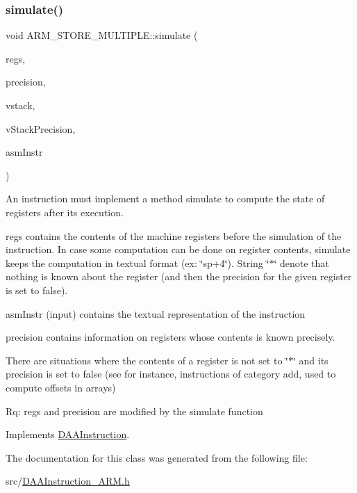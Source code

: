 \subsubsection{\texorpdfstring{simulate()}{simulate()}}
{\footnotesize\ttfamily void A\+R\+M\+\_\+\+S\+T\+O\+R\+E\+\_\+\+M\+U\+L\+T\+I\+P\+L\+E\+::simulate (\begin{DoxyParamCaption}\item[{\hyperlink{DAAInstruction_8h_af0fae93a861de9cf37988d5673cac523}{reg\+Table} \&}]{regs,  }\item[{\hyperlink{DAAInstruction_8h_a0e8cae02815a5f8adc750122d790b455}{reg\+Precision\+Table} \&}]{precision,  }\item[{\hyperlink{DAAInstruction_8h_a1b0e70ac1a04f06c8132055ed01f589f}{stack\+Type} \&}]{vstack,  }\item[{\hyperlink{DAAInstruction_8h_ac5cb793e9dac3fa9693da78b7e29ab30}{stack\+Prec\+Type} \&}]{v\+Stack\+Precision,  }\item[{const string \&}]{asm\+Instr }\end{DoxyParamCaption})\hspace{0.3cm}{\ttfamily [virtual]}}

An instruction must implement a method simulate to compute the state of registers after its execution.

regs contains the contents of the machine registers before the simulation of the instruction. In case some computation can be done on register contents, simulate keeps the computation in textual format (ex\+: \char`\"{}sp+4\char`\"{}). String \char`\"{}$\ast$\char`\"{} denote that nothing is known about the register (and then the precision for the given register is set to false).

asm\+Instr (input) contains the textual representation of the instruction

precision contains information on registers whose contents is known precisely.

There are situations where the contents of a register is not set to \char`\"{}$\ast$\char`\"{} and its precision is set to false (see for instance, instructions of category add, used to compute offsets in arrays)

Rq\+: regs and precision are modified by the simulate function 

Implements \hyperlink{classDAAInstruction_a61d0b9bece1e0ead89a46c0197276324}{D\+A\+A\+Instruction}.



The documentation for this class was generated from the following file\+:\begin{DoxyCompactItemize}
\item 
src/\hyperlink{DAAInstruction__ARM_8h}{D\+A\+A\+Instruction\+\_\+\+A\+R\+M.\+h}\end{DoxyCompactItemize}
